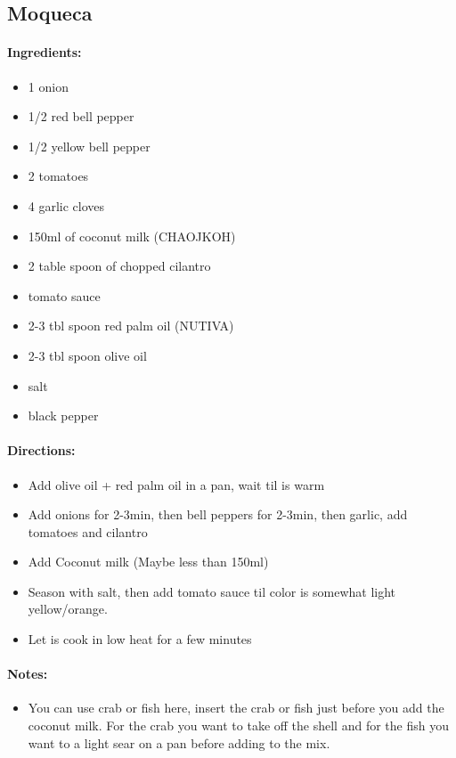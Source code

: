 \documentclass{article}
\begin{document}
\subsection{Moqueca}

\paragraph{Ingredients:}
\begin{itemize}
    \item 1 onion
    \item 1/2 red bell pepper
    \item 1/2 yellow bell pepper
    \item 2 tomatoes
    \item 4 garlic cloves
    \item 150ml of coconut milk (CHAOJKOH)
    \item 2 table spoon of chopped cilantro
    \item tomato sauce
    \item 2-3 tbl spoon red palm oil (NUTIVA)
    \item 2-3 tbl spoon olive oil
    \item salt
    \item black pepper
\end{itemize}

\paragraph{Directions:}
\begin{itemize}
    \item Add olive oil + red palm oil in a pan, wait til is warm
    \item Add onions for 2-3min, then bell peppers for 2-3min, then garlic, add tomatoes and cilantro
    \item Add Coconut milk (Maybe less than 150ml)
    \item Season with salt, then add tomato sauce til color is somewhat light yellow/orange.
    \item Let is cook in low heat for a few minutes
\end{itemize}

\paragraph{Notes:}
\begin{itemize}
    \item You can use crab or fish here, insert the crab or fish just before you add the coconut milk. For the crab you want to take off the shell and for the fish you want to a light sear on a pan before adding to the mix.
\end{itemize}
\end{document}
